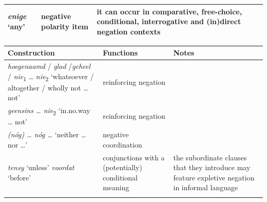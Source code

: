 \documentclass[output=paper,colorlinks,citecolor=brown]{langscibook}
\begin{document}
\begin{table}
\begin{tabularx}{\textwidth}{p{3cm}QQ}
\textit{enige} ‘any’ & negative polarity item & it can occur in comparative, free-choice, conditional, interrogative and (in)direct negation contexts \\
\midrule
\end{tabularx}
\end{table}

\begin{table} \footnotesize
\begin{tabularx}{\textwidth}{p{4cm}QQ}
\midrule
{Construction} & {Functions} & {Notes} \\
\midrule


\textit{hoegenaamd} / \textit{glad} /\textit{geheel} / \textit{nie}\textsubscript{1} … \textit{nie}\textsubscript{2} ‘whatsoever / altogether / wholly not … not’ & {reinforcing negation} & \\
\midrule

\textit{geensins … nie}\textsubscript{2} ‘in.no.way … not’ & {reinforcing negation} & \\
\midrule

\textit{(nóg) … nóg …} ‘neither … nor …’ & {negative coordination} & \\
\midrule

\textit{tensy} ‘unless’
\newline \textit{voordat} ‘before’ & conjunctions with a (potentially) conditional meaning  & the subordinate clauses that they introduce may feature expletive negation in informal language \\

\lspbottomrule
\end{tabularx}
\end{table}
\end{document}
